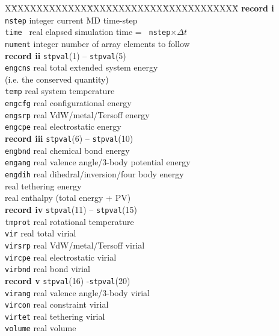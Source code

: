 \begin{tabbing}
X\=XXXXXXXXXXXX\=XXXXXXXXXXXX\=XXXXXXXXXXXX\=\kill
{\bf record i}\\
\> {\tt nstep} \> integer \> current MD time-step\\
\> {\tt  time }\>  real  \> elapsed simulation time = {\tt
nstep}$\times \Delta t$\\
\> {\tt nument} \> integer \> number of array elements to follow\\
{\bf record ii} {\tt stpval}(1) -- {\tt stpval}(5)\\
\> {\tt engcns} \> real \> total extended system energy \\
\> \> \> (i.e. the conserved quantity)\\
\> {\tt temp} \> real \> system temperature\\
\> {\tt engcfg} \> real \> configurational energy\\
\> {\tt engsrp} \> real \> VdW/metal/Tersoff energy\\
\> {\tt engcpe} \> real \> electrostatic energy\\
{\bf record iii}  {\tt stpval}(6) -- {\tt stpval}(10)\\
\> {\tt engbnd} \> real \> chemical bond energy\\
\> {\tt engang} \> real \> valence angle/3-body potential energy\\
\> {\tt engdih} \> real \> dihedral/inversion/four body energy\\
 \> real \> tethering energy\\
 \> real \> enthalpy (total energy + PV)\\
{\bf record iv} {\tt stpval}(11) -- {\tt stpval}(15)\\
\> {\tt tmprot} \> real \> rotational temperature\\
\> {\tt vir} \> real \> total virial\\
\> {\tt virsrp} \> real \> VdW/metal/Tersoff virial\\
\> {\tt vircpe} \> real \> electrostatic virial\\
\> {\tt virbnd} \> real \> bond virial\\
{\bf record v} {\tt stpval}(16) -{\tt stpval}(20)\\
\> {\tt virang} \> real \> valence angle/3-body virial\\
\> {\tt vircon} \> real \> constraint virial\\
\> {\tt virtet} \> real \> tethering virial\\
\> {\tt volume} \> real \> volume\\

\end{tabbing}
